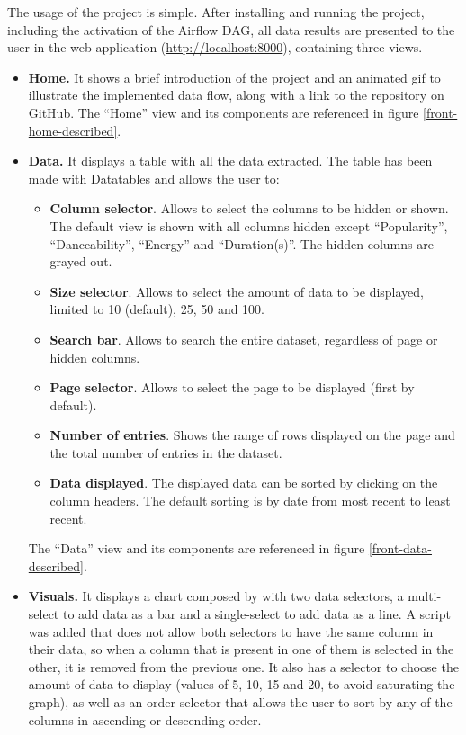 \nonzeroparskip The usage of the project is simple. After installing and running the project, including the activation of the Airflow DAG, all data results are presented to the user in the web application (\url{http://localhost:8000}), containing three views.
\begin{itemize}
	 \item \textbf{Home.} It shows a brief introduction of the project and an animated gif to illustrate the implemented data flow, along with a link to the repository on GitHub. The ``Home'' view and its components are referenced in figure \ref{front-home-described}.
	 \item \textbf{Data.} It displays a table with all the data extracted. The table has been made with Datatables and allows the user to:
	 \begin{itemize}
	 	\item \textbf{Column selector}. Allows to select the columns to be hidden or shown. The default view is shown with all columns hidden except ``Popularity'', ``Danceability'', ``Energy'' and ``Duration(s)''. The hidden columns are grayed out.
	 	\item \textbf{Size selector}. Allows to select the amount of data to be displayed, limited to 10 (default), 25, 50 and 100.
	 	\item \textbf{Search bar}. Allows to search the entire dataset, regardless of page or hidden columns.
	 	\item \textbf{Page selector}. Allows to select the page to be displayed (first by default).
	 	\item \textbf{Number of entries}. Shows the range of rows displayed on the page and the total number of entries in the dataset.
	 	\item \textbf{Data displayed}. The displayed data can be sorted by clicking on the column headers. The default sorting is by date from most recent to least recent.
	 \end{itemize}
	 The ``Data'' view and its components are referenced in figure \ref{front-data-described}.
	 \item \textbf{Visuals.} It displays a chart composed by 
	 with two data selectors, a multi-select to add data as a bar and a single-select to add data as a line. A script was added that does not allow both selectors to have the same column in their data, so when a column that is present in one of them is selected in the other, it is removed from the previous one. It also has a selector to choose the amount of data to display (values of 5, 10, 15 and 20, to avoid saturating the graph), as well as an order selector that allows the user to sort by any of the columns in ascending or descending order.

\end{itemize}
